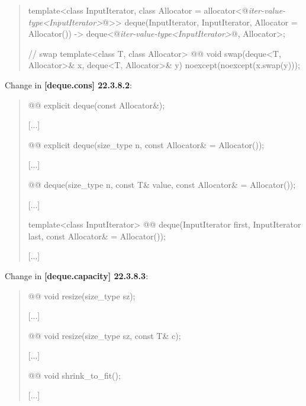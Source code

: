 \documentclass{wg21}
\begin{document}
\begin{quote}
\begin{codeblock}
{  template<class InputIterator,
           class Allocator = allocator<@\textit{iter-value-type<InputIterator>}@>>
    deque(InputIterator, InputIterator, Allocator = Allocator())
      -> deque<@\textit{iter-value-type<InputIterator>}@, Allocator>;

  // swap
  template<class T, class Allocator>
    @@ void swap(deque<T, Allocator>& x, deque<T, Allocator>& y)
      noexcept(noexcept(x.swap(y)));
}
\end{codeblock}%
\end{quote}

Change in \textbf{[deque.cons] 22.3.8.2}:
\begin{quote}
\begin{itemdecl}
@@ explicit deque(const Allocator&);
\end{itemdecl}
[...]
\begin{itemdecl}
@@ explicit deque(size_type n, const Allocator& = Allocator());
\end{itemdecl}
[...]
\begin{itemdecl}
@@ deque(size_type n, const T& value, const Allocator& = Allocator());
\end{itemdecl}
[...]
\begin{itemdecl}
template<class InputIterator>
  @@ deque(InputIterator first, InputIterator last,
                             const Allocator& = Allocator());
\end{itemdecl}
[...]
\end{quote}

Change in \textbf{[deque.capacity] 22.3.8.3}:
\begin{quote}
\begin{itemdecl}
@@ void resize(size_type sz);
\end{itemdecl}
[...]
\begin{itemdecl}
@@ void resize(size_type sz, const T& c);
\end{itemdecl}
[...]
\begin{itemdecl}
@@ void shrink_to_fit();
\end{itemdecl}
[...]
\end{quote}
\end{document}

